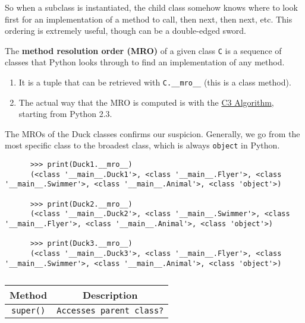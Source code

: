   So when a subclass is instantiated, the child class somehow knows where to look first for an implementation of a method to call, then next, then next, etc. This ordering is extremely useful, though can be a double-edged sword.   

  \begin{definition}
    The \textbf{method resolution order (MRO)} of a given class \texttt{C} is a sequence of classes that Python looks through to find an implementation of any method. 
    \begin{enumerate}
      \item It is a tuple that can be retrieved with \texttt{C.\_\_mro\_\_} (this is a class method). 
      \item The actual way that the MRO is computed is with the \href{https://docs.python.org/3/howto/mro.html}{C3 Algorithm}, starting from Python 2.3.
    \end{enumerate}
  \end{definition}

  \begin{example}
    The MROs of the Duck classes confirms our suspicion. Generally, we go from the most specific class to the broadest class, which is always \texttt{object} in Python. 

    \begin{lstlisting}
      >>> print(Duck1.__mro__)
      (<class '__main__.Duck1'>, <class '__main__.Flyer'>, <class '__main__.Swimmer'>, <class '__main__.Animal'>, <class 'object'>)

      >>> print(Duck2.__mro__)
      (<class '__main__.Duck2'>, <class '__main__.Swimmer'>, <class '__main__.Flyer'>, <class '__main__.Animal'>, <class 'object'>)

      >>> print(Duck3.__mro__)
      (<class '__main__.Duck3'>, <class '__main__.Flyer'>, <class '__main__.Swimmer'>, <class '__main__.Animal'>, <class 'object'>)
    \end{lstlisting}
  \end{example} 

  \begin{definition}
    \begin{table}[H]
      \centering
      \begin{tabular}{|c|c|}
        \hline
        \textbf{Method} & \textbf{Description} \\
        \hline
        \texttt{super()} & \texttt{Accesses parent class?} \\
        \hline
      \end{tabular}
      \caption{}
      \label{tab:}
    \end{table}
  \end{definition}


